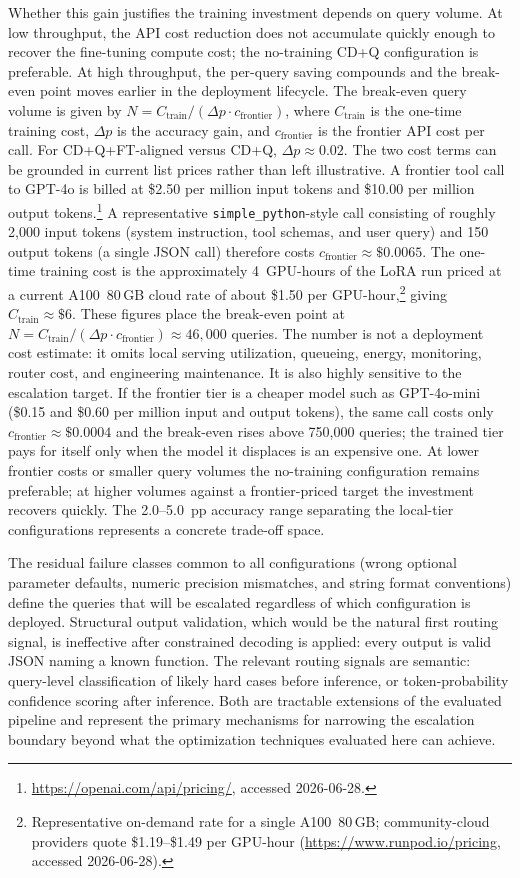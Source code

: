 Whether this gain justifies the training investment depends on query
volume. At low throughput, the API cost reduction does not accumulate
quickly enough to recover the fine-tuning compute cost; the no-training
CD+Q configuration is preferable. At high throughput, the per-query
saving compounds and the break-even point moves earlier in the
deployment lifecycle. The break-even query volume is given by
$N = C_{\text{train}} / (\Delta p \cdot c_{\text{frontier}})$,
where $C_{\text{train}}$ is the one-time training cost, $\Delta p$ is
the accuracy gain, and $c_{\text{frontier}}$ is the frontier API cost
per call. For CD+Q+FT-aligned versus CD+Q, $\Delta p \approx 0.02$. The two cost terms can
be grounded in current list prices rather than left illustrative. A frontier
tool call to GPT-4o is billed at \$2.50 per million input tokens and \$10.00 per
million output tokens.\footnote{\url{https://openai.com/api/pricing/}, accessed
2026-06-28.} A representative \texttt{simple\_python}-style call consisting of
roughly 2{,}000 input tokens (system instruction, tool schemas, and user query)
and 150 output tokens (a single JSON call) therefore costs
$c_{\text{frontier}} \approx \$0.0065$. The one-time training cost is the
approximately 4~GPU-hours of the LoRA run priced at a current A100~80\,GB cloud
rate of about \$1.50 per GPU-hour,\footnote{Representative on-demand rate for a
single A100~80\,GB; community-cloud providers quote \$1.19--\$1.49 per GPU-hour
(\url{https://www.runpod.io/pricing}, accessed 2026-06-28).} giving
$C_{\text{train}} \approx \$6$. These figures place the break-even point at
$N = C_{\text{train}} / (\Delta p \cdot c_{\text{frontier}}) \approx 46{,}000$
queries. The number is not a deployment cost estimate: it omits local serving
utilization, queueing, energy, monitoring, router cost, and engineering
maintenance. It is also highly sensitive to the escalation target. If the
frontier tier is a cheaper model such as GPT-4o-mini (\$0.15 and \$0.60 per
million input and output tokens), the same call costs only
$c_{\text{frontier}} \approx \$0.0004$ and the break-even rises above 750,000
queries; the trained tier pays for itself only when the model it displaces is an
expensive one. At lower frontier costs or smaller query volumes the no-training
configuration remains preferable; at higher volumes against a frontier-priced
target the investment recovers quickly. The 2.0--5.0~pp accuracy range separating the local-tier
configurations represents a concrete trade-off space.

The residual failure classes common to all configurations (wrong optional
parameter defaults, numeric precision mismatches, and string format
conventions) define the queries that will be escalated regardless of which
configuration is deployed. Structural output validation, which would be
the natural first routing signal, is ineffective after constrained decoding
is applied: every output is valid JSON naming a known function. The
relevant routing signals are semantic: query-level classification of
likely hard cases before inference, or token-probability confidence scoring
after inference. Both are tractable extensions of the evaluated pipeline
and represent the primary mechanisms for narrowing the escalation boundary
beyond what the optimization techniques evaluated here can achieve.


